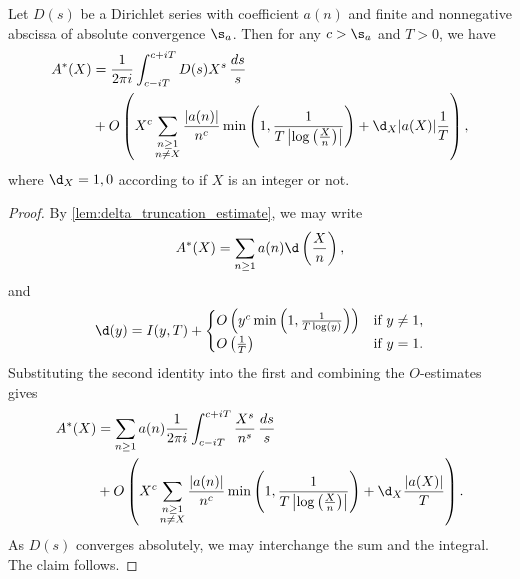 \documentclass[12pt]{article}
\begin{document}
      \begin{theorem*}
        Let \(D(s)\) be a Dirichlet series with coefficient \(a(n)\) and finite and nonnegative abscissa of absolute convergence \(\s_{a}\). Then for any \(c > \s_{a}\) and \(T > 0\), we have
        \begin{align*}
          A^{\ast}(X) &= \frac{1}{2\pi i}\int_{c-iT}^{c+iT}D(s)X^{s}\,\frac{ds}{s} \\
          &+ O\left(X^{c}\sum_{\substack{n \ge 1 \\ n \neq X}}\frac{|a(n)|}{n^{c}}\min\left(1,\frac{1}{T\left|\log\left(\frac{X}{n}\right)\right|}\right)+\d_{X}|a(X)|\frac{1}{T}\right),
        \end{align*}
        where \(\d_{X} = 1,0\) according to if \(X\) is an integer or not.
      \end{theorem*}
      \begin{proof}
        By \cref{lem:delta_truncation_estimate}, we may write
        \[
          A^{\ast}(X) = \sum_{n \ge 1}a(n)\d\left(\frac{X}{n}\right),
        \]
        and
        \[
          \d(y) = I(y,T)+\begin{cases} O\left(y^{c}\min\left(1,\frac{1}{T\log(y)}\right)\right) & \text{if \(y \neq 1\)}, \\ O\left(\frac{1}{T}\right) & \text{if \(y = 1\)}. \end{cases}
        \] 
        Substituting the second identity into the first and combining the \(O\)-estimates gives
        \begin{align*}
          A^{\ast}(X) &= \sum_{n \ge 1}a(n)\frac{1}{2\pi i}\int_{c-iT}^{c+iT}\frac{X^{s}}{n^{s}}\,\frac{ds}{s} \\
          &+ O\left(X^{c}\sum_{\substack{n \ge 1 \\ n \neq X}}\frac{|a(n)|}{n^{c}}\min\left(1,\frac{1}{T\left|\log\left(\frac{X}{n}\right)\right|}\right)+\d_{X}\frac{|a(X)|}{T}\right).
        \end{align*}
        As \(D(s)\) converges absolutely, we may interchange the sum and the integral. The claim follows. 
      \end{proof}
\end{document}
